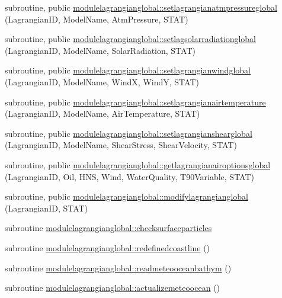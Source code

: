 \begin{DoxyCompactItemize}
\item 
subroutine, public \mbox{\hyperlink{namespacemodulelagrangianglobal_a98a63aa4ad8e0057fcd9682992e94c72}{modulelagrangianglobal\+::setlagrangianatmpressureglobal}} (Lagrangian\+ID, Model\+Name, Atm\+Pressure, S\+T\+AT)
\item 
subroutine, public \mbox{\hyperlink{namespacemodulelagrangianglobal_a7a50386c8ebd93860ae227d772932cd8}{modulelagrangianglobal\+::setlagsolarradiationglobal}} (Lagrangian\+ID, Model\+Name, Solar\+Radiation, S\+T\+AT)
\item 
subroutine, public \mbox{\hyperlink{namespacemodulelagrangianglobal_ac53f073d4f18ccb94ad14b1b035b9bd6}{modulelagrangianglobal\+::setlagrangianwindglobal}} (Lagrangian\+ID, Model\+Name, WindX, WindY, S\+T\+AT)
\item 
subroutine, public \mbox{\hyperlink{namespacemodulelagrangianglobal_ae5f676580934f8f401128b976eca5807}{modulelagrangianglobal\+::setlagrangianairtemperature}} (Lagrangian\+ID, Model\+Name, Air\+Temperature, S\+T\+AT)
\item 
subroutine, public \mbox{\hyperlink{namespacemodulelagrangianglobal_adc48b1a085b61254391390b4d5e28fa0}{modulelagrangianglobal\+::setlagrangianshearglobal}} (Lagrangian\+ID, Model\+Name, Shear\+Stress, Shear\+Velocity, S\+T\+AT)
\item 
subroutine, public \mbox{\hyperlink{namespacemodulelagrangianglobal_ad61d5f10ce5c10c555891aa6da16a247}{modulelagrangianglobal\+::getlagrangianairoptionsglobal}} (Lagrangian\+ID, Oil, H\+NS, Wind, Water\+Quality, T90\+Variable, S\+T\+AT)
\item 
subroutine, public \mbox{\hyperlink{namespacemodulelagrangianglobal_a658b1fd9232553dc9130f4f03e93e4c1}{modulelagrangianglobal\+::modifylagrangianglobal}} (Lagrangian\+ID, S\+T\+AT)
\item 
subroutine \mbox{\hyperlink{namespacemodulelagrangianglobal_af1cf941e45155a5b9a97ed3fe09f5c58}{modulelagrangianglobal\+::checksurfaceparticles}}
\item 
subroutine \mbox{\hyperlink{namespacemodulelagrangianglobal_a83377eb734750e27543838294b2cf44d}{modulelagrangianglobal\+::redefinedcoastline}} ()
\item 
subroutine \mbox{\hyperlink{namespacemodulelagrangianglobal_a46ea20c9e2d71865f07f69618754831d}{modulelagrangianglobal\+::readmeteooceanbathym}} ()
\item 
subroutine \mbox{\hyperlink{namespacemodulelagrangianglobal_a0fa07eb74ec148c5c6faeec4cd4561c9}{modulelagrangianglobal\+::actualizemeteoocean}} ()

\end{DoxyCompactItemize}
